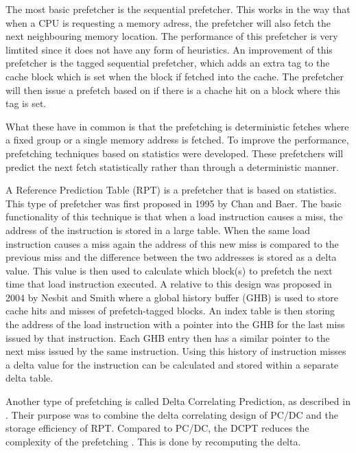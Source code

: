 The most basic prefetcher is the sequential prefetcher. This works in the way that when a CPU is requesting a memory adress, the prefetcher will also fetch the next neighbouring memory location. The performance of this prefetcher is very limtited since it does not have any form of heuristics. An improvement of this prefetcher is the tagged sequential prefetcher, which adds an extra tag to the cache block which is set when the block if fetched into the cache. The prefetcher will then issue a prefetch based on if there is a chache hit on a block where this tag is set.

What these have in common is that the prefetching is deterministic fetches where a fixed group or a single memory address is fetched. To improve the performance, prefetching techniques based on statistics were developed. These prefetchers will predict the next fetch statistically rather than through a deterministic manner.   

A Reference Prediction Table (RPT) is a prefetcher that is based on statistics. This type of prefetcher was first proposed in 1995 by Chan and Baer. The basic functionality of this technique is that when a load instruction causes a miss, the address of the instruction is stored in a large table. When the same load instruction causes a miss again the address of this new miss is compared to the previous miss and the difference between the two addresses is stored as a delta value. This value is then used to calculate which block(s) to prefetch the next time that load instruction executed. 
A relative to this design was proposed in 2004 by Nesbit and Smith where a global history buffer (GHB) is used to store cache hits and misses of prefetch-tagged blocks. An index table is then storing the address of the load instruction with a pointer into the GHB for the last miss issued by that instruction. Each GHB entry then has a similar pointer to the next miss issued by the same instruction. Using this history of instruction misses a delta value for the instruction can be calculated and stored within  a separate delta table.

Another type of prefetching is called Delta Correlating Prediction, as described in \cite{reference:jahre}. Their purpose was to combine the delta correlating design of PC/DC and the storage efficiency of RPT. Compared to PC/DC, the DCPT reduces the complexity of the prefetching . This is done by recomputing the delta.

